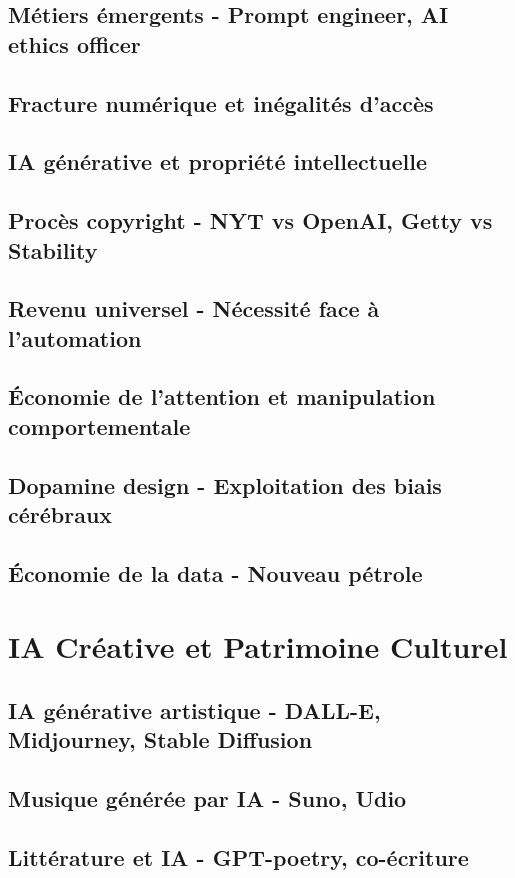 \documentclass[12pt,a4paper]{book}
\begin{document}
\section{Métiers émergents - Prompt engineer, AI ethics officer}
\section{Fracture numérique et inégalités d'accès}
\section{IA générative et propriété intellectuelle}
\section{Procès copyright - NYT vs OpenAI, Getty vs Stability}
\section{Revenu universel - Nécessité face à l'automation}
\section{Économie de l'attention et manipulation comportementale}
\section{Dopamine design - Exploitation des biais cérébraux}
\section{Économie de la data - Nouveau pétrole}

\chapter{IA Créative et Patrimoine Culturel}
\section{IA générative artistique - DALL-E, Midjourney, Stable Diffusion}
\section{Musique générée par IA - Suno, Udio}
\section{Littérature et IA - GPT-poetry, co-écriture}
\end{document}
